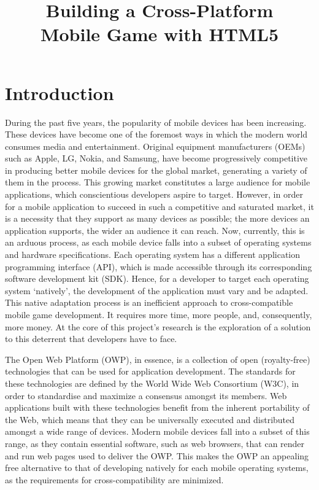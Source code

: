 \documentclass[final]{cmpreport}
\title{Building a Cross-Platform\\Mobile Game with HTML5}
\begin{document}
\section{Introduction}
\label{sec:intro}

During the past five years, the popularity of mobile devices has been increasing. These devices have become one of the foremost ways in which the modern world consumes media and entertainment. Original equipment manufacturers (OEMs) such as Apple, LG, Nokia, and Samsung, have become progressively competitive in producing better mobile devices for the global market, generating a variety of them in the process. This growing market constitutes a large audience for mobile applications, which conscientious developers aspire to target. However, in order for a mobile application to succeed in such a competitive and saturated market, it is a necessity that they support as many devices as possible; the more devices an application supports, the wider an audience it can reach. Now, currently, this is an arduous process, as each mobile device falls into a subset of operating systems and hardware specifications. Each operating system has a different application programming interface (API), which is made accessible through its corresponding software development kit (SDK). Hence, for a developer to target each operating system `natively', the development of the application must vary and be adapted. This native adaptation process is an inefficient approach to cross-compatible mobile game development. It requires more time, more people, and, consequently, more money. At the core of this project's research is the exploration of a solution to this deterrent that developers have to face.

The Open Web Platform (OWP), in essence, is a collection of open (royalty-free) technologies that can be used for application development. The standards for these technologies are defined by the World Wide Web Consortium (W3C), in order to standardise and maximize a consensus amongst its members. Web applications built with these technologies benefit from the inherent portability of the Web, which means that they can be universally executed and distributed amongst a wide range of devices. Modern mobile devices fall into a subset of this range, as they contain essential software, such as web browsers, that can render and run web pages used to deliver the OWP. This makes the OWP an appealing free alternative to that of developing natively for each mobile operating systems, as the requirements for cross-compatibility are minimized.
\end{document}
